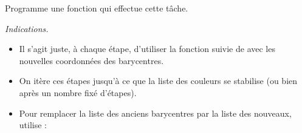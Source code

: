 \documentclass[10pt,class=report,crop=false]{standalone}
\begin{document}
\begin{activite}[Barycentres]
\begin{enumerate}
	Programme une fonction  qui effectue cette tâche.
	
	\smallskip
	
	\emph{Indications.}
	\begin{itemize}	
		\item Il s'agit juste, à chaque étape, d'utiliser la fonction 
		suivie de  avec les nouvelles coordonnées des barycentres.
		
		\item On itère ces étapes jusqu'à ce que la liste des couleurs se stabilise (ou bien après un nombre fixé d'étapes).
		
		\item Pour remplacer la liste des anciens barycentres par la liste des nouveaux, utilise :		
	\end{itemize}
\end{enumerate}

\medskip


\end{activite}
\end{document}
